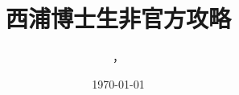 \documentclass[lang=cn,12pt,newtx]{elegantbook}
\title{西浦博士生非官方攻略}
\author{\KW，\SZ}
\date{\today}
\begin{document}
\maketitle
\frontmatter


\tableofcontents
\mainmatter






% 
% 


\backmatter	




\makeatletter
\makeatother
\end{document}
